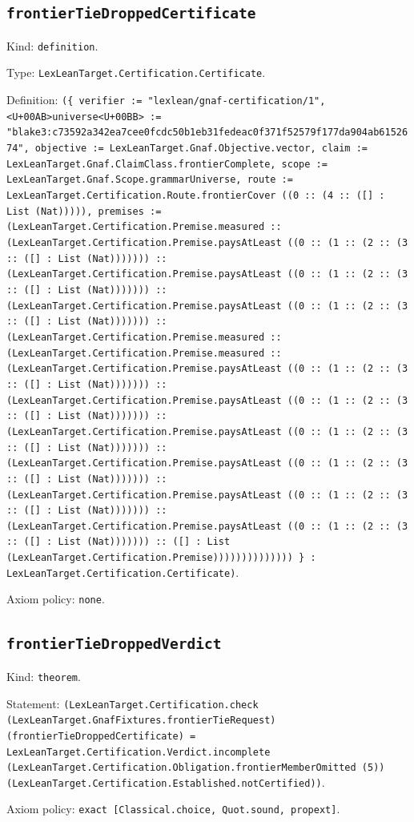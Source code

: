 \documentclass[11pt]{article}
\begin{document}
\subsection*{\texttt{frontierTieDroppedCertificate}}
\noindent Kind: \texttt{definition}.\par
\noindent Type: \texttt{LexLeanTarget.Certification.Certificate}.\par
\noindent Definition: \texttt{(\{ verifier := "lexlean/gnaf-certification/1", <U+00AB>universe<U+00BB> := "blake3:c73592a342ea7cee0fcdc50b1eb31fedeac0f371f52579f177da904ab6152674", objective := LexLeanTarget.Gnaf.Objective.vector, claim := LexLeanTarget.Gnaf.ClaimClass.frontierComplete, scope := LexLeanTarget.Gnaf.Scope.grammarUniverse, route := LexLeanTarget.Certification.Route.frontierCover ((0 :: (4 :: ([] : List (Nat))))), premises := (LexLeanTarget.Certification.Premise.measured :: (LexLeanTarget.Certification.Premise.paysAtLeast ((0 :: (1 :: (2 :: (3 :: ([] : List (Nat))))))) :: (LexLeanTarget.Certification.Premise.paysAtLeast ((0 :: (1 :: (2 :: (3 :: ([] : List (Nat))))))) :: (LexLeanTarget.Certification.Premise.paysAtLeast ((0 :: (1 :: (2 :: (3 :: ([] : List (Nat))))))) :: (LexLeanTarget.Certification.Premise.measured :: (LexLeanTarget.Certification.Premise.measured :: (LexLeanTarget.Certification.Premise.paysAtLeast ((0 :: (1 :: (2 :: (3 :: ([] : List (Nat))))))) :: (LexLeanTarget.Certification.Premise.paysAtLeast ((0 :: (1 :: (2 :: (3 :: ([] : List (Nat))))))) :: (LexLeanTarget.Certification.Premise.paysAtLeast ((0 :: (1 :: (2 :: (3 :: ([] : List (Nat))))))) :: (LexLeanTarget.Certification.Premise.paysAtLeast ((0 :: (1 :: (2 :: (3 :: ([] : List (Nat))))))) :: (LexLeanTarget.Certification.Premise.paysAtLeast ((0 :: (1 :: (2 :: (3 :: ([] : List (Nat))))))) :: (LexLeanTarget.Certification.Premise.paysAtLeast ((0 :: (1 :: (2 :: (3 :: ([] : List (Nat))))))) :: ([] : List (LexLeanTarget.Certification.Premise)))))))))))))) \} : LexLeanTarget.Certification.Certificate)}.\par
\noindent Axiom policy: \texttt{none}.\par
\subsection*{\texttt{frontierTieDroppedVerdict}}
\noindent Kind: \texttt{theorem}.\par
\noindent Statement: \texttt{(LexLeanTarget.Certification.check (LexLeanTarget.GnafFixtures.frontierTieRequest) (frontierTieDroppedCertificate) = LexLeanTarget.Certification.Verdict.incomplete (LexLeanTarget.Certification.Obligation.frontierMemberOmitted (5)) (LexLeanTarget.Certification.Established.notCertified))}.\par
\noindent Axiom policy: \texttt{exact [Classical.choice, Quot.sound, propext]}.\par
\end{document}
